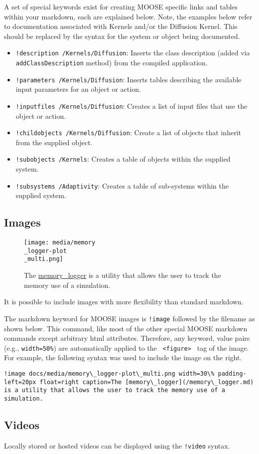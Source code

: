 \documentclass[]{report}
\begin{document}
\par
A set of special keywords exist for creating MOOSE specific links and tables within your markdown, each are explained below. Note, the
examples below refer to documentation associated with Kernels and/or the Diffusion Kernel. This should be replaced by
the syntax for the system or object being documented.\begin{itemize}
\item \texttt{!description /Kernels/Diffusion}: Inserts the class description (added via \texttt{addClassDescription} method) from the compiled application.
\item \texttt{!parameters /Kernels/Diffusion}: Inserts tables describing the available input parameters for an object or action.
\item \texttt{!inputfiles /Kernels/Diffusion}: Creates a list of input files that use the object or action.
\item \texttt{!childobjects /Kernels/Diffusion}: Create a list of objects that inherit from the supplied object.
\item \texttt{!subobjects /Kernels}: Creates a table of objects within the supplied system.
\item \texttt{!subsystems /Adaptivity}: Creates a table of sub-systems within the supplied system.
\end{itemize}\subsection{Images\label{images}}
\par
\begin{figure*}
\texttt{[image: media/memory\\\_logger-plot\\\_multi.png]}
\caption{The \href{/memory\_logger.md}{memory\_logger} is a utility that allows the user to track the memory use of a simulation.}
\end{figure*}
\par
It is possible to include images  with more flexibility than standard markdown.
\par
The markdown keyword for MOOSE images is \texttt{!image} followed by the filename as shown below. This command, like most of the other
special MOOSE markdown commands except arbitrary html attributes. Therefore, any keyword, value pairs (e.g., \texttt{width=50\%}) are
automatically applied to the \texttt{
  <figure>
   } tag of the image. For example, the following syntax was used to include the image on the right.\begin{lstlisting}
!image docs/media/memory\_logger-plot\_multi.png width=30\% padding-left=20px float=right caption=The [memory\_logger](/memory\_logger.md) is a utility that allows the user to track the memory use of a simulation.
\end{lstlisting}\subsection{Videos\label{videos}}
\par
Locally stored or hosted videos can be displayed using the \texttt{!video} syntax.
\par
\end{document}
